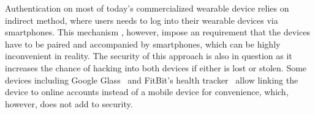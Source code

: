 Authentication on most of today's commercialized wearable device relies on indirect method, where users needs to log into their wearable devices via smartphones. This mechanism  , however, impose an requirement that the devices have to be paired and accompanied by smartphones, which can be highly inconvenient in reality. The security of this approach is also in question as it increases the chance of hacking into both devices if either is lost or stolen. Some devices including Google Glass~\cite{googleglass} and FitBit's health tracker~\cite{fitbit} allow linking the device to online accounts instead of a mobile device for convenience,  which, however, does not add to security.
\fi

